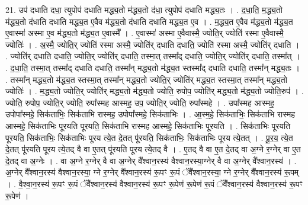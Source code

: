 \documentclass[17pt]{extarticle}
\begin{document}
21. उप॑ दधाति दधा॒ त्युपोप॑ दधाति मद्ध्य॒तो म॑द्ध्य॒तो द॑धा॒ त्युपोप॑ दधाति मद्ध्य॒तः । . द॒धा॒ति॒ म॒द्ध्य॒तो म॑द्ध्य॒तो द॑धाति दधाति मद्ध्य॒त ए॒वैव म॑द्ध्य॒तो द॑धाति दधाति मद्ध्य॒त ए॒व । . म॒द्ध्य॒त ए॒वैव म॑द्ध्य॒तो म॑द्ध्य॒त ए॒वास्मा॑ अस्मा ए॒व म॑द्ध्य॒तो म॑द्ध्य॒त ए॒वास्मै᳚ । . ए॒वास्मा॑ अस्मा ए॒वैवास्मै॒ ज्योति॒र् ज्योति॑ रस्मा ए॒वैवास्मै॒ ज्योतिः॑ । . अ॒स्मै॒ ज्योति॒र् ज्योति॑ रस्मा अस्मै॒ ज्योति॑र् दधाति दधाति॒ ज्योति॑ रस्मा अस्मै॒ ज्योति॑र् दधाति । . ज्योति॑र् दधाति दधाति॒ ज्योति॒र् ज्योति॑र् दधाति॒ तस्मा॒त् तस्मा᳚द् दधाति॒ ज्योति॒र् ज्योति॑र् दधाति॒ तस्मा᳚त् । . द॒धा॒ति॒ तस्मा॒त् तस्मा᳚द् दधाति दधाति॒ तस्मा᳚न् मद्ध्य॒तो म॑द्ध्य॒त स्तस्मा᳚द् दधाति दधाति॒ तस्मा᳚न् मद्ध्य॒तः । . तस्मा᳚न् मद्ध्य॒तो म॑द्ध्य॒त स्तस्मा॒त् तस्मा᳚न् मद्ध्य॒तो ज्योति॒र् ज्योति॑र् मद्ध्य॒त स्तस्मा॒त् तस्मा᳚न् मद्ध्य॒तो ज्योतिः॑ । . म॒द्ध्य॒तो ज्योति॒र् ज्योति॑र् मद्ध्य॒तो म॑द्ध्य॒तो ज्योति॒ रुपोप॒ ज्योति॑र् मद्ध्य॒तो म॑द्ध्य॒तो ज्योति॒रुप॑ । . ज्योति॒ रुपोप॒ ज्योति॒र् ज्योति॒ रुपा᳚स्मह आस्मह॒ उप॒ ज्योति॒र् ज्योति॒ रुपा᳚स्महे । . उपा᳚स्मह आस्मह॒ उपोपा᳚स्महे॒ सिक॑ताभिः॒ सिक॑ताभि रास्मह॒ उपोपा᳚स्महे॒ सिक॑ताभिः । . आ॒स्म॒हे॒ सिक॑ताभिः॒ सिक॑ताभि रास्मह आस्महे॒ सिक॑ताभिः पूरयति पूरयति॒ सिक॑ताभि रास्मह आस्महे॒ सिक॑ताभिः पूरयति । . सिक॑ताभिः पूरयति पूरयति॒ सिक॑ताभिः॒ सिक॑ताभिः पूरय त्ये॒त दे॒तत् पू॑रयति॒ सिक॑ताभिः॒ सिक॑ताभिः पूरय त्ये॒तत् । . पू॒र॒य॒ त्ये॒त दे॒तत् पू॑रयति पूरय त्ये॒तद् वै वा ए॒तत् पू॑रयति पूरय त्ये॒तद् वै । . ए॒तद् वै वा ए॒त दे॒तद् वा अ॒ग्ने र॒ग्नेर् वा ए॒त दे॒तद् वा अ॒ग्नेः । . वा अ॒ग्ने र॒ग्नेर् वै वा अ॒ग्नेर् वै᳚श्वान॒रस्य॑ वैश्वान॒रस्या॒ग्नेर् वै वा अ॒ग्नेर् वै᳚श्वान॒रस्य॑ । . अ॒ग्नेर् वै᳚श्वान॒रस्य॑ वैश्वान॒रस्या॒ ग्ने र॒ग्नेर् वै᳚श्वान॒रस्य॑ रू॒पꣳ रू॒पं ॅवै᳚श्वान॒रस्या॒ ग्ने र॒ग्नेर् वै᳚श्वान॒रस्य॑ रू॒पम् । . वै॒श्वा॒न॒रस्य॑ रू॒पꣳ रू॒पं ॅवै᳚श्वान॒रस्य॑ वैश्वान॒रस्य॑ रू॒पꣳ रू॒पेण॑ रू॒पेण॑ रू॒पं ॅवै᳚श्वान॒रस्य॑ वैश्वान॒रस्य॑ रू॒पꣳ रू॒पेण॑ । \newline
\end{document}
